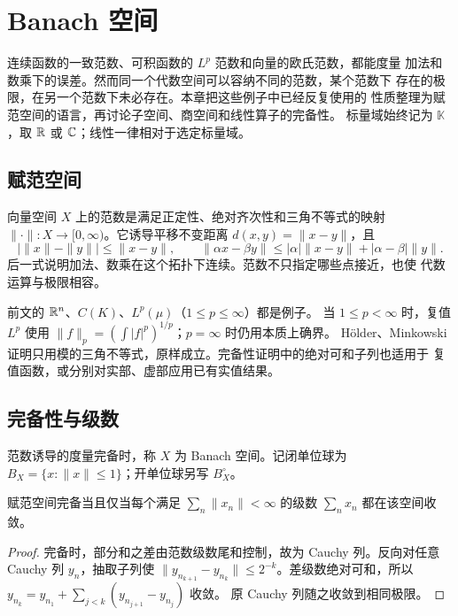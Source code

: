 \chapter{Banach 空间}
\label{chap:banach-spaces}

连续函数的一致范数、可积函数的 \(L^p\) 范数和向量的欧氏范数，都能度量
加法和数乘下的误差。然而同一个代数空间可以容纳不同的范数，某个范数下
存在的极限，在另一个范数下未必存在。本章把这些例子中已经反复使用的
性质整理为赋范空间的语言，再讨论子空间、商空间和线性算子的完备性。
标量域始终记为 \(\mathbb K\)，取 \(\mathbb{R}\) 或 \(\mathbb{C}\)；线性一律相对于选定标量域。

\section{赋范空间}

向量空间 \(X\) 上的范数是满足正定性、绝对齐次性和三角不等式的映射
\(\|\cdot\|:X\to[0,\infty)\)。它诱导平移不变距离
\(d(x,y)=\|x-y\|\)，且
\[
 |\|x\|-\|y\||\le\|x-y\|,\qquad
 \|\alpha x-\beta y\|\le|\alpha|\|x-y\|+|\alpha-\beta|\|y\|.
\]
后一式说明加法、数乘在这个拓扑下连续。范数不只指定哪些点接近，也使
代数运算与极限相容。

前文的 \(\mathbb{R}^n\)、\(C(K)\)、\(L^p(\mu)\)（\(1\le p\le\infty\)）都是例子。
当 \(1\le p<\infty\) 时，复值 \(L^p\) 使用
\(\|f\|_p=(\int|f|^p)^{1/p}\)；\(p=\infty\) 时仍用本质上确界。
Hölder、Minkowski
证明只用模的三角不等式，原样成立。完备性证明中的绝对可和子列也适用于
复值函数，或分别对实部、虚部应用已有实值结果。

\section{完备性与级数}

\begin{definition}
范数诱导的度量完备时，称 \(X\) 为 Banach 空间。记闭单位球为
\(B_X=\{x:\|x\|\le1\}\)；开单位球另写 \(B_X^\circ\)。
\end{definition}

\begin{proposition}\label{prop:banach-series-test}
赋范空间完备当且仅当每个满足 \(\sum_n\|x_n\|<\infty\) 的级数
\(\sum_nx_n\) 都在该空间收敛。
\end{proposition}
\begin{proof}
完备时，部分和之差由范数级数尾和控制，故为 Cauchy 列。反向对任意
Cauchy 列 \(y_n\)，抽取子列使
\(\|y_{n_{k+1}}-y_{n_k}\|\le2^{-k}\)。差级数绝对可和，所以
\(y_{n_k}=y_{n_1}+\sum_{j<k}(y_{n_{j+1}}-y_{n_j})\) 收敛。
原 Cauchy 列随之收敛到相同极限。
\end{proof}

